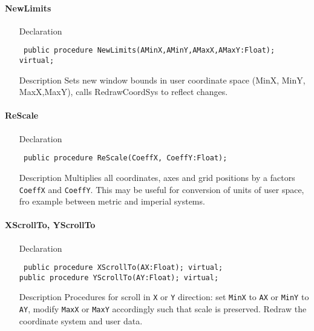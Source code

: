 \documentclass[12pt,a4paper,oneside]{report}
\newcommand{\declarationitem}[1]{{\addfontfeatures{FakeBold=1.3} #1}}
\newcommand{\descriptiontitle}[1]{{\addfontfeatures{FakeSlant}#1}}
\newcommand{\code}[1]{\texttt{#1}}
\begin{document}
\paragraph{NewLimits}\hspace*{\fill}
\label{lmcoordsys.TCoordSys-NewLimits}
\begin{itemize}\item[\declarationitem{Declaration}\hfill]
	\begin{flushleft}
		\code{
			public procedure NewLimits(AMinX,AMinY,AMaxX,AMaxY:Float); virtual;}
	\end{flushleft}
	\item[\descriptiontitle{Description}]
	Sets new window bounds in user coordinate space (MinX, MinY, MaxX,MaxY), calls RedrawCoordSys to reflect changes.
\end{itemize}
\paragraph{ReScale}\hspace*{\fill}\label{lmcoordsys.TCoordSys-ReScale}
\begin{itemize}\item[\declarationitem{Declaration}\hfill]
	\begin{flushleft}
		\code{
			public procedure ReScale(CoeffX, CoeffY:Float);}
	\end{flushleft}
	\item[\descriptiontitle{Description}]
	Multiplies all coordinates, axes and grid positions by a factors \code{CoeffX} and \code{CoeffY}. This may be useful for conversion of units of user space, fro example between metric and imperial systems.
	
\end{itemize}
\paragraph{XScrollTo, YScrollTo}\hspace*{\fill}
\label{lmcoordsys.TCoordSys-XScrollTo}
\begin{itemize}\item[\declarationitem{Declaration}\hfill]
	\begin{flushleft}
		\code{
			public procedure XScrollTo(AX:Float); virtual;\\
			public procedure YScrollTo(AY:Float); virtual;}
	\end{flushleft}
	\item[\descriptiontitle{Description}]
	Procedures for scroll in \code{X} or \code{Y} direction: set \code{MinX} to \code{AX} or \code{MinY} to \code{AY}, modify \code{MaxX} or \code{MaxY} accordingly such that scale is preserved. Redraw the coordinate system and user data.
\end{itemize}
\end{document}
